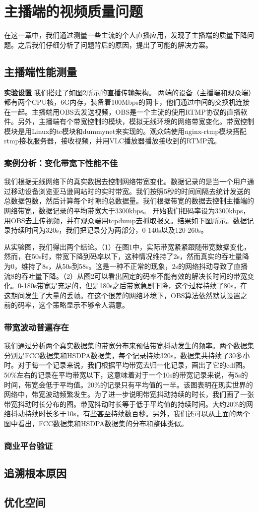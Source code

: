 \chapter{主播端的视频质量问题}
在这一章中，我们通过测量一些主流的个人直播应用，发现了主播端的质量下降问题。之后我们仔细分析了问题背后的原因，提出了可能的解决方案。

\section{主播端性能测量}
\textbf{实验设置} 我们搭建了如图2所示的直播传输架构。 两端的设备（主播端和观众端）都有两个CPU核，6G内存，装备着100Mbps的网卡，他们通过中间的交换机连接在一起。主播端用OBS去发送视频，OBS是一个主流的使用RTMP协议的直播软件。另外，主播端有个带宽控制的模块，模拟无线环境的网络带宽变化。带宽控制模块是用Linux的tc模块和dummynet来实现的。观众端使用nginx-rtmp模块搭配rtmp接收服务器，接收视频，并用VLC播放器播放接收到的RTMP流。

\subsection{案例分析：变化带宽下性能不佳}
我们根据无线网络下的真实数据去控制网络带宽变化。数据记录的是当一个用户通过移动设备浏览亚马逊网站时的实时带宽。我们按照5秒的时间间隔去统计发送的总数据包数，然后计算每个时隙的总数据量。我们根据带宽的数据去控制主播端的网络带宽，数据记录的平均带宽大于3300kbps。 开始我们把码率设为3300kbps，用OBS去上传视频，并在观众端用tcpdump去抓取报文。结果如下图所示。数据记录持续时间为320s，我们把记录分为两部分，0-140s以及120-260s。

从实验图，我们得出两个结论。（1）在图1中，实际带宽紧紧跟随带宽数据变化，然而，在50s时，带宽下降到码率以下，这种情况维持了2s，然而真实的吞吐量降为0，维持了8s，从50s到58s。这是一种不正常的现象，2s的网络抖动导致了直播流8的吞吐量下降。（2）从图2可以看出固定的码率不能有效的解决长时间的带宽变化。0-180s带宽是充足的，但是180s之后带宽急剧下降，这个过程持续了80s，在这期间发生了大量的丢帧。在这个很差的网络环境下，OBS算法依然默认设置之前的码率，这个策略显示不够令人满意。

\subsection{带宽波动普遍存在}
我们通过分析两个真实数据集的带宽分布来预估带宽抖动发生的频率。两个数据集分别是FCC数据集和HSDPA数据集，每个记录持续320s，数据集共持续了30多小时。对于每一个记录来说，我们根据平均带宽去归一化记录，画出了它的cdf图。50\%左右的记录在平均带宽以下，这意味着对于一个10s的带宽记录来说，有5s的时间，带宽会低于平均值。20\%的记录只有平均值的一半。该图表明在现实世界的网络中，带宽波动频繁发生。为了进一步说明带宽抖动持续的时长，我们画了一张带宽抖动时长分布的图。带宽抖动时长等于低于平均值的持续时间。大约20\%的网络抖动持续时长多于10s，有些甚至持续数百秒。另外，我们还可以从上面的两个图中看出，FCC数据集和HSDPA数据集的分布和整体类似。

\subsection{商业平台验证}

\section{追溯根本原因}

\section{优化空间}